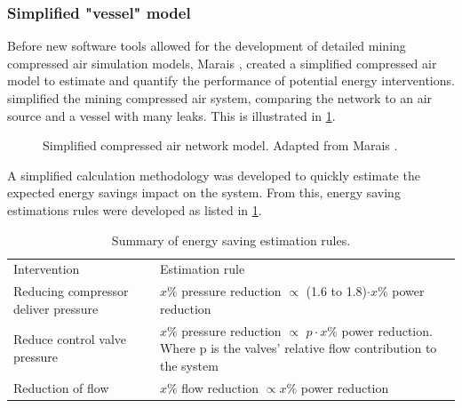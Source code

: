 \subsubsection{Simplified "vessel"  model}
Before new software tools allowed for the development of detailed mining compressed air simulation models, Marais \cite{Marais2012PhD},\cite{marais2013simplification} created a simplified compressed air model to estimate and quantify the performance of potential energy interventions.  \cite{Marais2012PhD} simplified the mining compressed air system, comparing the network to an air source and a vessel with many leaks. This is illustrated in \cref{fig:Marais vessel model}.
\begin{figure}[h!]
	\centering
	\caption[Simplified compressed air netowrk model.]{Simplified compressed air network model. Adapted from Marais \cite{Marais2012PhD}.}
	\label{fig:Marais vessel model}
\end{figure}
\par 
A simplified calculation methodology was developed to quickly estimate the expected energy savings impact on the system. From this, energy saving estimations rules were developed as listed in \cref{table: Rules of thumb}.  
\par 
\begin{table}[h]
	\centering
	\begin{tabular}{p{}p{}p{}}
		\hline
		Intervention && Estimation rule\\
		\hhline{===} 
		Reducing compressor deliver pressure & & $x \%$ pressure reduction  $\propto$ (1.6 to 1.8)$\cdot x\%$ power reduction \newline \\
		Reduce control valve pressure &  &$x \%$ pressure reduction $\propto$  $p\cdot x\%$ power reduction. \newline \newline Where p is the valves' relative flow contribution to the system \newline \\
		Reduction of flow && $x \%$ flow reduction  $\propto x \%$ power reduction \newline\\
		\hline
	\end{tabular} 
	\caption[Summary of energy saving estimation rules]{Summary of energy saving estimation rules\cite{Marais2012PhD}.}
	\label{table: Rules of thumb}
\end{table}
